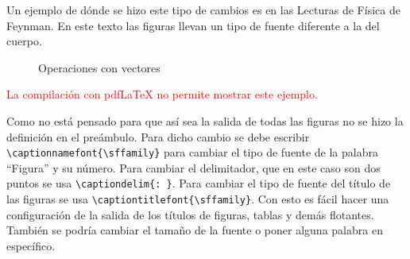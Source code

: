 Un ejemplo de dónde se hizo este tipo de cambios es en las Lecturas de Física
de Feynman. En este texto las figuras llevan un tipo de fuente diferente a la
del cuerpo.
\ifluatex%
\begin{figure}[h]
\centering
\begin{minipage}{0.4\linewidth}
\centering
{}

  \captionnamefont{\sffamily}
  \label{fig:vect1}
\end{minipage}
\hfill
\begin{minipage}{0.4\linewidth}
\centering
{}

  \captionnamefont{\sffamily}
  \label{fig:vect2}
\end{minipage}
  \captionnamefont{\sffamily}
  \caption{\sffamily Operaciones con vectores}
  \label{fig:vect}
\end{figure}
\else
\ifpdftex%
\begin{center}
\textcolor{red}{La compilación con pdf\LaTeX{} no permite mostrar este
ejemplo.}
\end{center}
\fi
\fi

Como no está pensado para que así sea la salida de todas las figuras no se
hizo la definición en el preámbulo. Para dicho cambio se debe escribir
\verb|\captionnamefont{\sffamily}| para cambiar el tipo de fuente de la
palabra \enquote{Figura} y su número. Para cambiar el delimitador, que en este caso
son dos puntos se usa \verb|\captiondelim{: }|. Para cambiar el tipo de
fuente del título de las figuras se usa \verb|\captiontitlefont{\sffamily}|.
Con esto es fácil hacer una configuración de la salida de los títulos de
figuras, tablas y demás flotantes. También se podría cambiar el tamaño de la fuente o poner
alguna palabra en específico.

